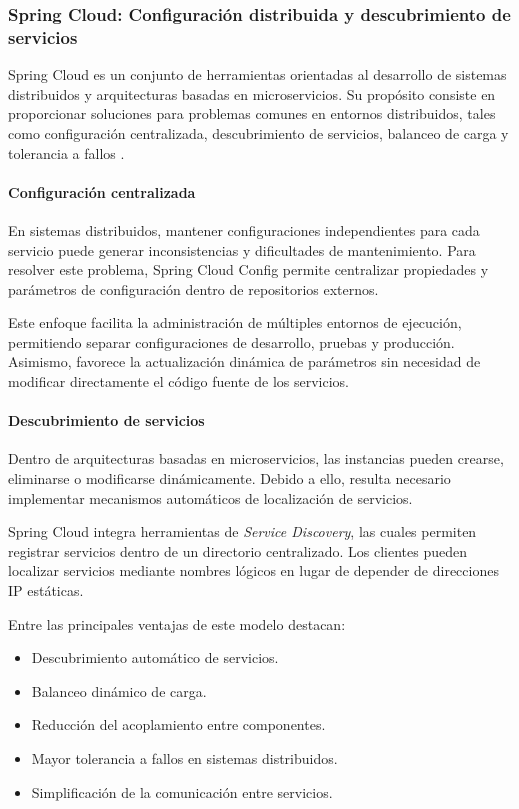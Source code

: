 \documentclass[12pt, oneside, letterpaper]{book}
\begin{document}
\subsubsection{Spring Cloud: Configuración distribuida y descubrimiento de servicios}

Spring Cloud es un conjunto de herramientas orientadas al desarrollo de sistemas distribuidos y arquitecturas basadas en microservicios. Su propósito consiste en proporcionar soluciones para problemas comunes en entornos distribuidos, tales como configuración centralizada, descubrimiento de servicios, balanceo de carga y tolerancia a fallos \cite{53}.

\paragraph{Configuración centralizada}

En sistemas distribuidos, mantener configuraciones independientes para cada servicio puede generar inconsistencias y dificultades de mantenimiento. Para resolver este problema, Spring Cloud Config permite centralizar propiedades y parámetros de configuración dentro de repositorios externos.

Este enfoque facilita la administración de múltiples entornos de ejecución, permitiendo separar configuraciones de desarrollo, pruebas y producción. Asimismo, favorece la actualización dinámica de parámetros sin necesidad de modificar directamente el código fuente de los servicios.

\paragraph{Descubrimiento de servicios}

Dentro de arquitecturas basadas en microservicios, las instancias pueden crearse, eliminarse o modificarse dinámicamente. Debido a ello, resulta necesario implementar mecanismos automáticos de localización de servicios.

Spring Cloud integra herramientas de \textit{Service Discovery}, las cuales permiten registrar servicios dentro de un directorio centralizado. Los clientes pueden localizar servicios mediante nombres lógicos en lugar de depender de direcciones IP estáticas.

Entre las principales ventajas de este modelo destacan:

\begin{itemize}
\item Descubrimiento automático de servicios.
\item Balanceo dinámico de carga.
\item Reducción del acoplamiento entre componentes.
\item Mayor tolerancia a fallos en sistemas distribuidos.
\item Simplificación de la comunicación entre servicios.
\end{itemize}
\end{document}
